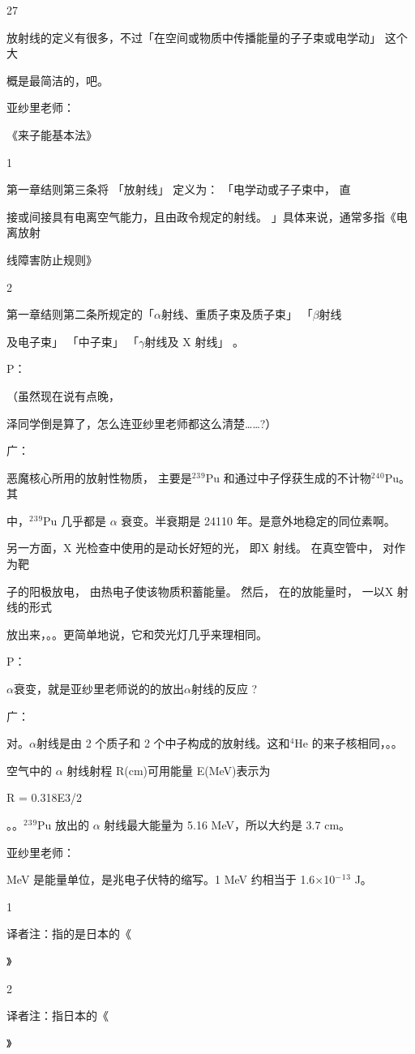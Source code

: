 27\par
放射线的定义有很多，不过「在空间或物质中传播能量的子子束或电学动」 这个大\par
概是最简洁的，吧。\par
亚纱里老师：\par
《来子能基本法》\par
1\par
第一章结则第三条将 「放射线」 定义为： 「电学动或子子束中， 直\par
接或间接具有电离空气能力，且由政令规定的射线。 」具体来说，通常多指《电离放射\par
线障害防止规则》\par
2\par
第一章结则第二条所规定的「$\alpha$射线、重质子束及质子束」 「$\beta$射线\par
及电子束」 「中子束」 「$\gamma$射线及 X 射线」 。\par
P：\par
（虽然现在说有点晚，\par
泽同学倒是算了，怎么连亚纱里老师都这么清楚……?）\par
广：\par
恶魔核心所用的放射性物质， 主要是$^{2}$$^{3}$$^{9}$Pu 和通过中子俘获生成的不计物$^{2}$$^{4}$$^{0}$Pu。其\par
中，$^{2}$$^{3}$$^{9}$Pu 几乎都是 $\alpha$ 衰变。半衰期是 24110 年。是意外地稳定的同位素啊。\par
另一方面，X 光检查中使用的是动长好短的光， 即X 射线。 在真空管中， 对作为靶\par
子的阳极放电， 由热电子使该物质积蓄能量。 然后， 在的放能量时， 一以X 射线的形式\par
放出来，。。更简单地说，它和荧光灯几乎来理相同。\par
P：\par
$\alpha$衰变，就是亚纱里老师说的的放出$\alpha$射线的反应 ?\par
广：\par
对。$\alpha$射线是由 2 个质子和 2 个中子构成的放射线。这和$^{4}$He 的来子核相同，。。\par
空气中的 $\alpha$ 射线射程 R(cm)可用能量 E(MeV)表示为\par
R = 0.318E3/2\par
。。$^{2}$$^{3}$$^{9}$Pu 放出的 $\alpha$ 射线最大能量为 5.16 MeV，所以大约是 3.7 cm。\par
亚纱里老师：\par
MeV 是能量单位，是兆电子伏特的缩写。1 MeV 约相当于 1.6$\times$10$^{-}$$^{1}$$^{3}$ J。\par
1\par
译者注：指的是日本的《\par
》\par
2\par
译者注：指日本的《\par
》\par


